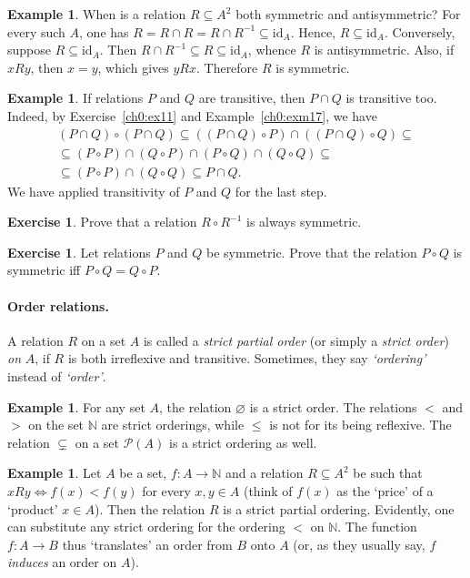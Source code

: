 \documentclass[12pt,notitlepage]{article}
\theoremstyle{plain}
\theoremstyle{definition}
\newtheorem{exc}[thm]{Exercise}
\newtheorem{exm}[thm]{Example}
\theoremstyle{plain}
\newcommand{\N}{\mathbb{N}}
\newcommand{\sbs}{\subseteq}
\newcommand{\void}{\varnothing}
\newcommand{\mP}{\mathcal{P}}
\newcommand{\id}{\mathrm{id}}
\newcommand{\1}{\mathbf{1}}
\newcommand{\0}{\mathbf{0}}
\begin{document}
\begin{exm}
When is a relation $R \sbs A^2$ both symmetric and antisymmetric? For every such $A$, one has $R = R \cap R = R \cap R^{-1} \sbs \id_A$. Hence, $R \sbs \id_A$. Conversely, suppose $R \sbs \id_A$. Then $R \cap R^{-1} \sbs R \sbs \id_A$, whence $R$ is antisymmetric. Also, if $xRy$, then $x = y$, which gives $yRx$. Therefore $R$ is symmetric.
\end{exm}

\begin{exm}\label{ch0:comp_trans}
If relations $P$ and $Q$ are transitive, then $P \cap Q$ is transitive too. Indeed, by Exercise~\ref{ch0:ex11} and Example~\ref{ch0:exm17}, we have
\begin{multline*}
(P \cap Q)\circ(P \cap Q) \sbs ((P \cap Q)\circ P) \cap ((P \cap Q) \circ Q) \sbs\\
\sbs (P \circ P) \cap (Q \circ P) \cap (P \circ Q) \cap (Q \circ Q) \sbs\\
\sbs (P \circ P) \cap  (Q \circ Q) \sbs P \cap Q.
\end{multline*}
We have applied transitivity of $P$ and $Q$ for the last step.
\end{exm}

\begin{exc}
Prove that a relation $R \circ R^{-1}$ is always symmetric.
\end{exc}

\begin{exc}
Let relations $P$ and $Q$ be symmetric. Prove that the relation $P \circ Q$ is symmetric iff $P \circ Q = Q \circ P$.
\end{exc}


\paragraph{Order relations.} A relation $R$ on a set $A$ is called a \emph{strict partial order} (or simply a \emph{strict order}) \emph{on} $A$, if $R$ is both irreflexive and transitive. Sometimes, they say \emph{`ordering'} instead of \emph{`order'}.
\begin{exm}
For any set  $A$, the relation $\void$ is a strict order. The relations ${<}$ and ${>}$ on the set $\N$ are strict orderings, while ${\leq}$ is not for its being reflexive. The relation ${\subsetneq}$ on a set $\mP(A)$ is a strict ordering as well.
\end{exm}

\begin{exm}\label{ch0:induced0}
Let $A$ be a set, $f\colon A \to \N$ and a relation $R \sbs A^2$ be such that $x R y \iff f(x) < f(y)$ for every $x, y \in A$ (think of $f(x)$ as the `price' of a `product' $x \in A$). Then the relation $R$ is a strict partial ordering. Evidently, one can substitute any strict ordering for the ordering ${<}$ on $\N$. The function $f\colon A \to B$ thus `translates' an order from $B$ onto $A$ (or, as they usually say, $f$ \emph{induces} an order on $A$).
\end{exm}
\end{document}
